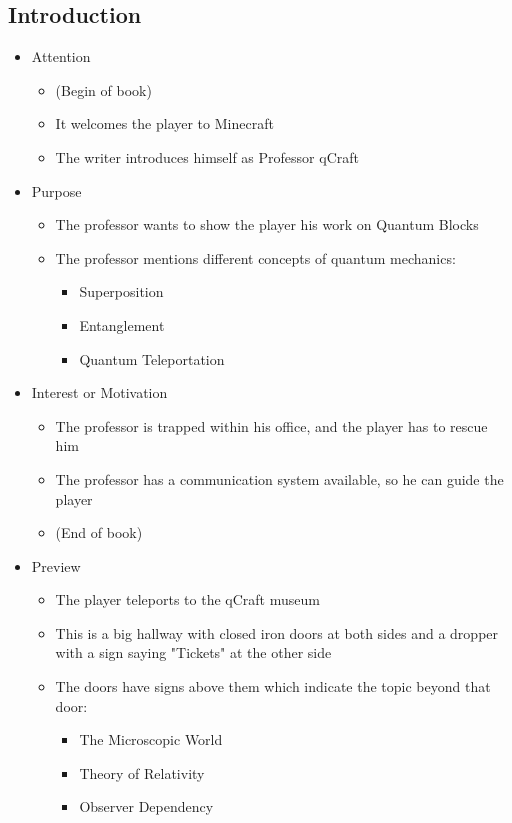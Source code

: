 \documentclass[11pt,twoside]{report} %
\begin{document}
\subsection{Introduction}

\begin{itemize}
	\item Attention
	\begin{itemize}
		\item (Begin of book)
		\item It welcomes the player to Minecraft
		\item The writer introduces himself as Professor qCraft
	\end{itemize}
	\item Purpose
	\begin{itemize}
		\item The professor wants to show the player his work on Quantum Blocks
		\item The professor mentions different concepts of quantum mechanics:
		\begin{itemize}
			\item Superposition
			\item Entanglement
			\item Quantum Teleportation
		\end{itemize}
	\end{itemize}
	\item Interest or Motivation
	\begin{itemize}
		\item The professor is trapped within his office, and the player has to rescue him
		\item The professor has a communication system available, so he can guide the player
		\item (End of book)
	\end{itemize}
	\item Preview
	\begin{itemize}
		\item The player teleports to the qCraft museum
		\item This is a big hallway with closed iron doors at both sides and a dropper with a sign saying "Tickets" at the other side
		\item The doors have signs above them which indicate the topic beyond that door:
		\begin{itemize}
			\item The Microscopic World
			\item Theory of Relativity
			\item Observer Dependency

\end{itemize}
\end{itemize}
\end{itemize}
\end{document}
